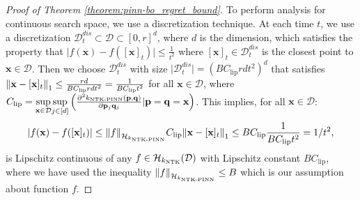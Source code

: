 \begin{proof}[Proof of Theorem \ref{theorem:pinn-bo_regret_bound}]
    

To perform analysis for continuous search space, we use a discretization technique. At each time $t$, we use a discretization $\mathcal{D}_t^{dis} \subset \mathcal{D} \subset [0, r]^d$, where $d$ is the dimension, which satisfies the property that $\lvert f(\mathbf{x}) - f([\mathbf{x}]_t) \rvert \leq \frac{1}{t^2}$ where $[\mathbf{x}]_t \in \mathcal{D}_t^{dis}$ is the closest point to $\mathbf{x} \in \mathcal{D}$. Then we choose $\mathcal{D}_t^{dis}$ 
with size $\lvert \mathcal{D}_t^{dis} \rvert = \left( BC_{\text{lip}}rdt^2 \right)^d$ that satisfies $\norm{\mathbf{x} - [\mathbf{x}]_t}_1 \leq \frac{rd}{BC_{\text{lip}}rdt^2} = \frac{1}{BC_{\text{lip}}t^2}$ for all $\mathbf{x} \in \mathcal{D}$,
where $C_{\text{lip}}= \underset{\mathbf{x} \in \mathcal{D}} {\operatorname*{sup}} \underset{j \in [d]} {\operatorname*{sup}} \left( \frac{\partial^2 k_\text{NTK-PINN}(\mathbf{p},\mathbf{q})}{\partial \mathbf{p}_j \mathbf{q}_j} \lvert \mathbf{p}=\mathbf{q}=\mathbf{x} \right)$. This implies, for all $\mathbf{x} \in \mathcal{D}$:
\begin{align*}
    \lvert f(\mathbf{x}) - f([\mathbf{x}]_t) \rvert \leq \norm{f}_{\mathcal{H}_{k_\textup{NTK-PINN}}} C_{\text{lip}} \norm{\mathbf{x} - [\mathbf{x}]_t}_1 \leq BC_{\text{lip}} \frac{1}{BC_{\text{lip}}t^2} =  1/t^2, 
\end{align*}
is Lipschitz continuous of any $f \in \mathcal{H}_{k_\textup{NTK}}(\mathcal{D})$ with Lipschitz constant $B C_{\text{lip}}$, where we have used the inequality $\norm{f}_{\mathcal{H}_{k_\textup{NTK-PINN}}} \leq B $  which is our assumption about function $f$.


\end{proof}
